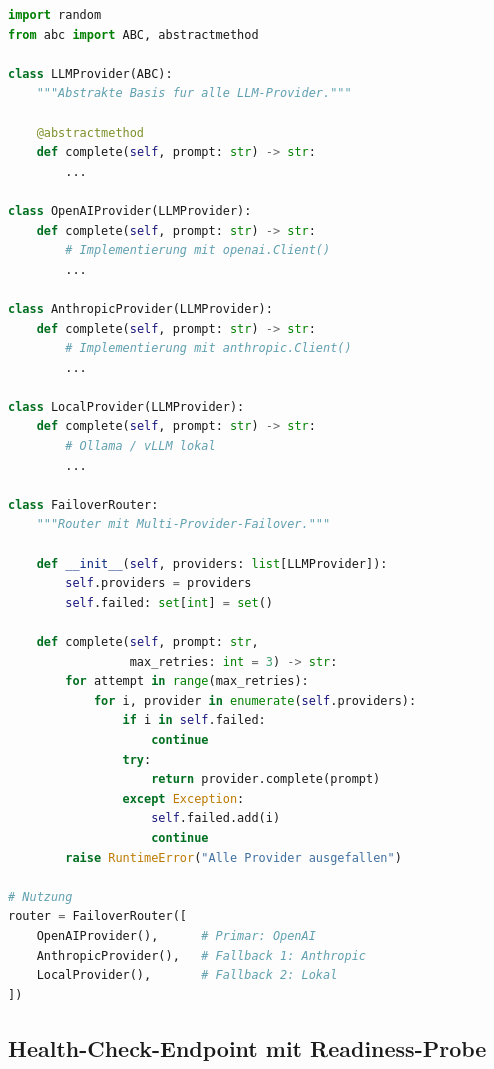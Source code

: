 \begin{lstlisting}[language=Python, caption={Multi-Region- und Multi-Provider-Failover}, label=lst:multiregion]
import random
from abc import ABC, abstractmethod

class LLMProvider(ABC):
    """Abstrakte Basis fur alle LLM-Provider."""

    @abstractmethod
    def complete(self, prompt: str) -> str:
        ...

class OpenAIProvider(LLMProvider):
    def complete(self, prompt: str) -> str:
        # Implementierung mit openai.Client()
        ...

class AnthropicProvider(LLMProvider):
    def complete(self, prompt: str) -> str:
        # Implementierung mit anthropic.Client()
        ...

class LocalProvider(LLMProvider):
    def complete(self, prompt: str) -> str:
        # Ollama / vLLM lokal
        ...

class FailoverRouter:
    """Router mit Multi-Provider-Failover."""

    def __init__(self, providers: list[LLMProvider]):
        self.providers = providers
        self.failed: set[int] = set()

    def complete(self, prompt: str,
                 max_retries: int = 3) -> str:
        for attempt in range(max_retries):
            for i, provider in enumerate(self.providers):
                if i in self.failed:
                    continue
                try:
                    return provider.complete(prompt)
                except Exception:
                    self.failed.add(i)
                    continue
        raise RuntimeError("Alle Provider ausgefallen")

# Nutzung
router = FailoverRouter([
    OpenAIProvider(),      # Primar: OpenAI
    AnthropicProvider(),   # Fallback 1: Anthropic
    LocalProvider(),       # Fallback 2: Lokal
])
\end{lstlisting}

\subsection{Health-Check-Endpoint mit Readiness-Probe}

